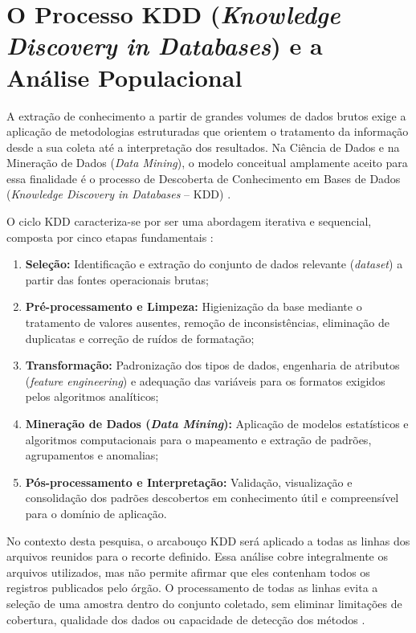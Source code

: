 \documentclass[
    12pt,               %
    openright,          %
    oneside,            %
    a4paper,            %
    chapter=TITLE,      %
    sumario=tradicional,%
    english,            %
    brazilian,          %
 ]{abntex2}
\begin{document}
\section{O Processo KDD (\textit{Knowledge Discovery in Databases}) e a Análise Populacional}\label{sec:kdd_analise_populacional}

A extração de conhecimento a partir de grandes volumes de dados brutos exige a aplicação de metodologias estruturadas que orientem o tratamento da informação desde a sua coleta até a interpretação dos resultados. Na Ciência de Dados e na Mineração de Dados (\textit{Data Mining}), o modelo conceitual amplamente aceito para essa finalidade é o processo de Descoberta de Conhecimento em Bases de Dados (\textit{Knowledge Discovery in Databases} -- KDD) \cite{goldschmidt2005, pereira2025}.

O ciclo KDD caracteriza-se por ser uma abordagem iterativa e sequencial, composta por cinco etapas fundamentais \cite{goldschmidt2005}:
\begin{enumerate}
    \item \textbf{Seleção:} Identificação e extração do conjunto de dados relevante (\textit{dataset}) a partir das fontes operacionais brutas;
    \item \textbf{Pré-processamento e Limpeza:} Higienização da base mediante o tratamento de valores ausentes, remoção de inconsistências, eliminação de duplicatas e correção de ruídos de formatação;
    \item \textbf{Transformação:} Padronização dos tipos de dados, engenharia de atributos (\textit{feature engineering}) e adequação das variáveis para os formatos exigidos pelos algoritmos analíticos;
    \item \textbf{Mineração de Dados (\textit{Data Mining}):} Aplicação de modelos estatísticos e algoritmos computacionais para o mapeamento e extração de padrões, agrupamentos e anomalias;
    \item \textbf{Pós-processamento e Interpretação:} Validação, visualização e consolidação dos padrões descobertos em conhecimento útil e compreensível para o domínio de aplicação.
\end{enumerate}

No contexto desta pesquisa, o arcabouço KDD será aplicado a todas as linhas dos arquivos reunidos para o recorte definido. Essa análise cobre integralmente os arquivos utilizados, mas não permite afirmar que eles contenham todos os registros publicados pelo órgão. O processamento de todas as linhas evita a seleção de uma amostra dentro do conjunto coletado, sem eliminar limitações de cobertura, qualidade dos dados ou capacidade de detecção dos métodos \cite{pereira2025}.
\end{document}
